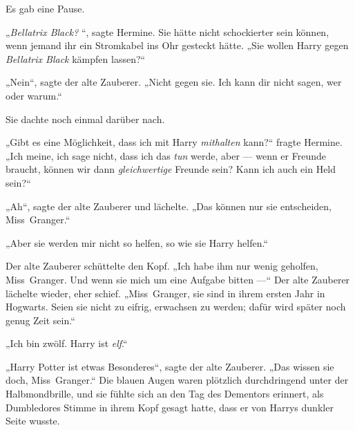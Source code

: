 Es gab eine Pause.

„\emph{Bellatrix Black? }“, sagte Hermine. Sie hätte nicht schockierter sein können, wenn jemand ihr ein Stromkabel ins Ohr gesteckt hätte.
„Sie wollen Harry gegen \emph{Bellatrix Black} kämpfen lassen?“

„Nein“, sagte der alte Zauberer.
„Nicht gegen sie. Ich kann dir nicht sagen, wer oder warum.“

Sie dachte noch einmal darüber nach.

„Gibt es eine Möglichkeit, dass ich mit Harry \emph{mithalten} kann?“ fragte Hermine.
„Ich meine, ich sage nicht, dass ich das \emph{tun} werde, aber — wenn er Freunde braucht, können wir dann \emph{gleichwertige} Freunde sein? Kann ich auch ein Held sein?“

„Ah“, sagte der alte Zauberer und lächelte.
„Das können nur sie entscheiden, Miss~Granger.“

„Aber sie werden mir nicht so helfen, so wie sie Harry helfen.“

Der alte Zauberer schüttelte den Kopf.
„Ich habe ihm nur wenig geholfen, Miss~Granger. Und wenn sie mich um eine Aufgabe bitten —“ Der alte Zauberer lächelte wieder, eher schief.
„Miss~Granger, sie sind in ihrem ersten Jahr in Hogwarts. Seien sie nicht zu eifrig, erwachsen zu werden; dafür wird später noch genug Zeit sein.“

„Ich bin zwölf. Harry ist \emph{elf}.“

„Harry Potter ist etwas Besonderes“, sagte der alte Zauberer.
„Das wissen sie doch, Miss~Granger.“ Die blauen Augen waren plötzlich durchdringend unter der Halbmondbrille, und sie fühlte sich an den Tag des Dementors erinnert, als Dumbledores Stimme in ihrem Kopf gesagt hatte, dass er von Harrys dunkler Seite wusste.

